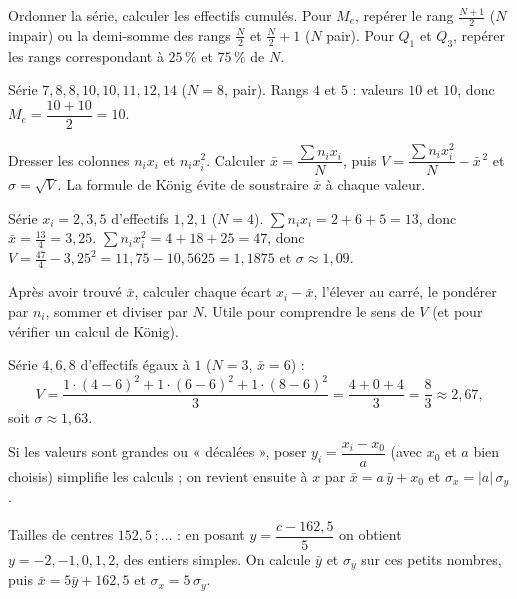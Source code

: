Ordonner la série, calculer les effectifs cumulés. Pour $M_e$, repérer le rang
$\frac{N+1}{2}$ ($N$ impair) ou la demi-somme des rangs $\frac{N}{2}$ et
$\frac{N}{2}+1$ ($N$ pair). Pour $Q_1$ et $Q_3$, repérer les rangs correspondant à
$25\,\%$ et $75\,\%$ de $N$.
\begin{exemple}
Série $7,8,8,10,10,11,12,14$ ($N=8$, pair). Rangs $4$ et $5$ : valeurs $10$ et $10$,
donc $M_e=\dfrac{10+10}{2}=10$.
\end{exemple}

Dresser les colonnes $n_ix_i$ et $n_ix_i^2$. Calculer $\bar x=\dfrac{\sum n_ix_i}{N}$,
puis $V=\dfrac{\sum n_ix_i^2}{N}-\bar x^{\,2}$ et $\sigma=\sqrt V$. La formule de König
évite de soustraire $\bar x$ à chaque valeur.
\begin{exemple}
Série $x_i=2,3,5$ d'effectifs $1,2,1$ ($N=4$). $\sum n_ix_i=2+6+5=13$, donc
$\bar x=\frac{13}{4}=3{,}25$. $\sum n_ix_i^2=4+18+25=47$, donc
$V=\frac{47}{4}-3{,}25^2=11{,}75-10{,}5625=1{,}1875$ et $\sigma\approx1{,}09$.
\end{exemple}

Après avoir trouvé $\bar x$, calculer chaque écart $x_i-\bar x$, l'élever au carré, le
pondérer par $n_i$, sommer et diviser par $N$. Utile pour comprendre le sens de $V$
(et pour vérifier un calcul de König).
\begin{exemple}
Série $4,6,8$ d'effectifs égaux à $1$ ($N=3$, $\bar x=6$) :
\[ V=\frac{1\cdot(4-6)^2+1\cdot(6-6)^2+1\cdot(8-6)^2}{3}=\frac{4+0+4}{3}=\frac{8}{3}\approx2{,}67, \]
soit $\sigma\approx1{,}63$.
\end{exemple}

Si les valeurs sont grandes ou « décalées », poser $y_i=\dfrac{x_i-x_0}{a}$ (avec
$x_0$ et $a$ bien choisis) simplifie les calculs ; on revient ensuite à $x$ par
$\bar x=a\,\bar y+x_0$ et $\sigma_x=|a|\,\sigma_y$.
\begin{exemple}
Tailles de centres $152{,}5\,;\dots$ : en posant $y=\dfrac{c-162{,}5}{5}$ on obtient
$y=-2,-1,0,1,2$, des entiers simples. On calcule $\bar y$ et $\sigma_y$ sur ces
petits nombres, puis $\bar x=5\bar y+162{,}5$ et $\sigma_x=5\,\sigma_y$.
\end{exemple}
